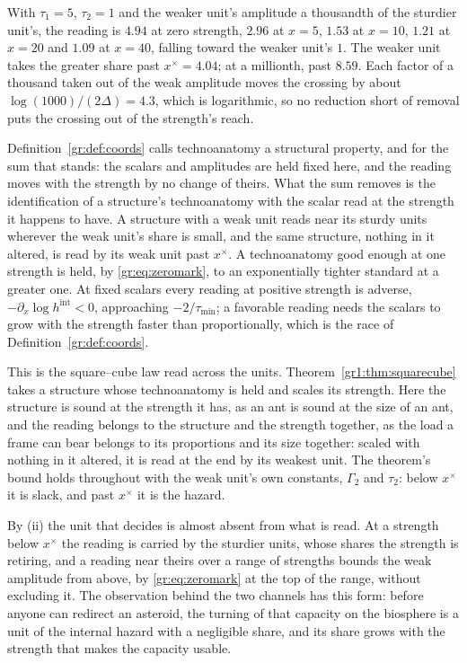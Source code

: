 With $\tau_1=5$, $\tau_2=1$ and the weaker unit's amplitude a thousandth of
the sturdier unit's, the reading is $4.94$ at zero strength, $2.96$ at
$x=5$, $1.53$ at $x=10$, $1.21$ at $x=20$ and $1.09$ at $x=40$, falling
toward the weaker unit's $1$. The weaker unit takes the greater share
past $x^\times=4.04$; at a millionth, past $8.59$. Each factor of a
thousand taken out of the weak amplitude moves the crossing by about
$\log(1000)/(2\Delta)=4.3$, which is logarithmic, so no reduction short of
removal puts the crossing out of the strength's reach.

Definition~\ref{gr:def:coords} calls technoanatomy a structural property,
and for the sum that stands: the scalars and amplitudes are held fixed
here, and the reading moves with the strength by no change of theirs.
What the sum removes is the identification of a structure's technoanatomy
with the scalar read at the strength it happens to have. A structure with
a weak unit reads near its sturdy units wherever the weak unit's share is
small, and the same structure, nothing in it altered, is read by its weak
unit past $x^\times$. A technoanatomy good enough at one strength is held,
by \eqref{gr:eq:zeromark}, to an exponentially tighter standard at a
greater one. At fixed scalars every reading at positive strength is
adverse, $-\partial_x\log h^{\mathrm{int}}<0$, approaching
$-2/\tau_{\min}$; a favorable reading needs the scalars to grow with the
strength faster than proportionally, which is the race of
Definition~\ref{gr:def:coords}.

This is the square--cube law read across the units.
Theorem~\ref{gr1:thm:squarecube} takes a structure whose technoanatomy is
held and scales its strength. Here the structure is sound at the strength
it has, as an ant is sound at the size of an ant, and the reading belongs
to the structure and the strength together, as the load a frame can bear
belongs to its proportions and its size together: scaled with nothing in
it altered, it is read at the end by its weakest unit. The theorem's bound
holds throughout with the weak unit's own constants, $\Gamma_2$ and
$\tau_2$: below $x^\times$ it is slack, and past $x^\times$ it is the
hazard.

By (ii) the unit that decides is almost absent from what is read. At a
strength below $x^\times$ the reading is carried by the sturdier units,
whose shares the strength is retiring, and a reading near theirs over a
range of strengths bounds the weak amplitude from above, by
\eqref{gr:eq:zeromark} at the top of the range, without excluding it. The
observation behind the two channels has this form: before anyone can
redirect an asteroid, the turning of that capacity on the biosphere is a
unit of the internal hazard with a negligible share, and its share grows
with the strength that makes the capacity usable.


